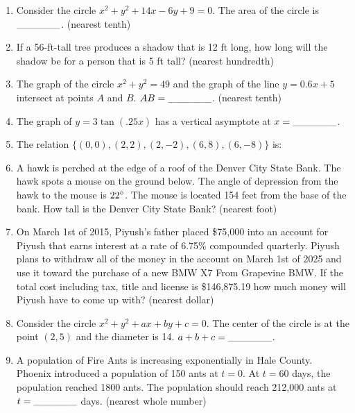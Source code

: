 \documentclass[../uilmath.tex]{subfiles}
\begin{document}
\begin{enumerate}[label=\bfseries\arabic*.]
    \item %
    Consider the circle $x^2+y^2+14x-6y+9=0$. The area of the circle is $\_\_\_\_\_\_$. (nearest tenth)

    \item %
    If a 56-ft-tall tree produces a shadow that is 12 ft long, how long will the shadow be for a person that is 5 ft tall? (nearest hundredth)

    \item %
    The graph of the circle $x^2+y^2=49$ and the graph of the line $y=0.6x+5$ intersect at points $A$ and $B$. $AB=\_\_\_\_\_\_$. (nearest tenth)

    \item %
    The graph of $y=3\tan(.25x)$ has a vertical asymptote at $x=\_\_\_\_\_\_$.

    \item %
    The relation $\{(0,0), (2,2), (2,-2), (6,8), (6,-8)\}$ is:

    \item %
    A hawk is perched at the edge of a roof of the Denver City State Bank. The hawk spots a mouse on the ground below. The angle of depression from the hawk to the 
    mouse is $22\degree$. The mouse is located 154 feet from the base of the bank. How tall is the Denver City State Bank? (nearest foot)

    \item %
    On March 1st of 2015, Piyush's father placed \$75,000 into an account for Piyush that earns interest at a rate of 6.75\% compounded 
    quarterly. Piyush plans to withdraw all of the money in the account on March 1st of 2025 and use it toward the purchase of a new BMW X7 From 
    Grapevine BMW. If the total cost including tax, title and license is \$146,875.19 how much money will Piyush have to come up with? (nearest dollar)

    \item %
    Consider the circle $x^2+y^2+ax+by+c=0$. The center of the circle is at the point $(2,5)$ and the diameter is 14. $a+b+c=\_\_\_\_\_\_$.

    \item %
    A population of Fire Ants is increasing exponentially in Hale County. Phoenix introduced a population of 150 ants at $t=0$. 
    At $t=60$ days, the population reached 1800 ants. The population should reach 212,000 ants at $t=\_\_\_\_\_\_$ days. (nearest whole number)


\end{enumerate}
\end{document}
